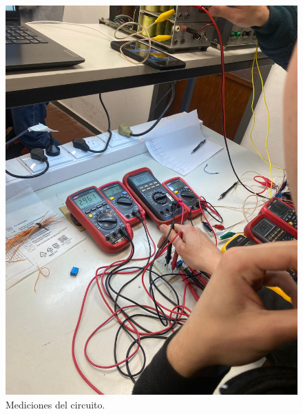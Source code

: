    \begin{figure}[!ht]

        \begin{minipage}{0.5\textwidth}
            \includegraphics[width=1\textwidth]{tp3/pictures/setup_crkt-3_1.jpeg}
            \caption{Mediciones del circuito.}
 

\end{minipage}
\end{figure}

